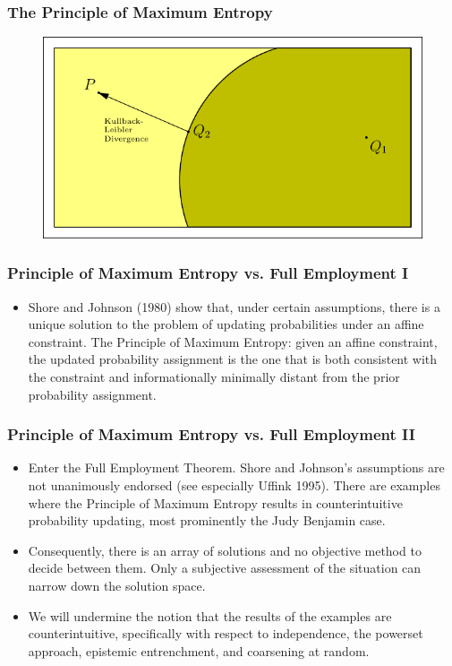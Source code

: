 \documentclass[xcolor=dvipsnames]{beamer}
\begin{document}
\begin{frame}
  \frametitle{The Principle of Maximum Entropy}
\begin{figure}[h]
\includegraphics[scale=1.0]{../diagrams/constraint-d.pdf}
\end{figure}
\end{frame}

\begin{frame}
  \frametitle{Principle of Maximum Entropy vs. Full Employment I}
\begin{itemize}
\item Shore and Johnson (1980) show that, under certain
  assumptions, there is a unique solution to the problem of
  updating probabilities under an affine constraint. The Principle
  of Maximum Entropy: given an affine constraint, the updated
  probability assignment is the one that is both consistent with
  the constraint and informationally minimally distant from the
  prior probability assignment.
\end{itemize}
\end{frame}

\begin{frame}
  \frametitle{Principle of Maximum Entropy vs. Full Employment II}
\begin{itemize}
\item Enter the Full Employment Theorem. Shore and Johnson's
  assumptions are not unanimously endorsed (see especially Uffink
  1995). There are examples where the Principle of Maximum Entropy
  results in counterintuitive probability updating, most
  prominently the Judy Benjamin case.
\item Consequently, there is an array of solutions and no
  objective method to decide between them. Only a subjective
  assessment of the situation can narrow down the solution space.
\item We will undermine the notion that the results of the
  examples are counterintuitive, specifically with respect to
  independence, the powerset approach, epistemic entrenchment, and
  coarsening at random.
\end{itemize}
\end{frame}
\end{document}
